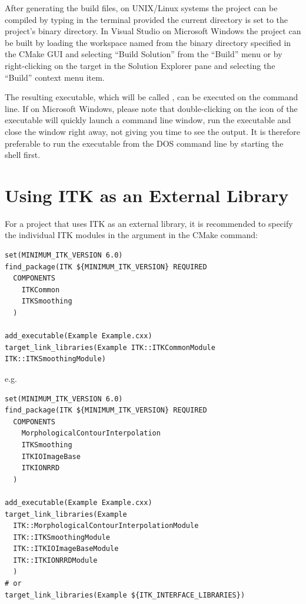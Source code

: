 After generating the build files, on UNIX/Linux systems the project can be
compiled by typing  in the terminal provided the current directory
is set to the project's binary directory. In Visual Studio on Microsoft Windows
the project can be built by loading the workspace named 
from the binary directory specified in the CMake GUI and selecting
``Build Solution'' from the ``Build'' menu or by right-clicking on
the  target in the Solution Explorer pane and selecting
the ``Build'' context menu item.

The resulting executable, which will be called , can be
executed on the command line. If on Microsoft Windows, please note that
double-clicking on the icon of the executable will quickly launch a command line
window, run the executable and close the window right away, not giving you time
to see the output. It is therefore preferable to run the executable from the DOS
command line by starting the  shell first.

\section{Using ITK as an External Library}%
\label{sec:UsingITKAsExternalLibrary}

For a project that uses ITK as an external library, it is recommended to
specify the individual ITK modules in the  argument in the
 CMake command:

\small
\begin{verbatim}
set(MINIMUM_ITK_VERSION 6.0)
find_package(ITK ${MINIMUM_ITK_VERSION} REQUIRED
  COMPONENTS
    ITKCommon
    ITKSmoothing
  )

add_executable(Example Example.cxx)
target_link_libraries(Example ITK::ITKCommonModule ITK::ITKSmoothingModule)
\end{verbatim}
\normalsize

e.g.

\small
\begin{verbatim}
set(MINIMUM_ITK_VERSION 6.0)
find_package(ITK ${MINIMUM_ITK_VERSION} REQUIRED
  COMPONENTS
    MorphologicalContourInterpolation
    ITKSmoothing
    ITKIOImageBase
    ITKIONRRD
  )

add_executable(Example Example.cxx)
target_link_libraries(Example
  ITK::MorphologicalContourInterpolationModule
  ITK::ITKSmoothingModule
  ITK::ITKIOImageBaseModule
  ITK::ITKIONRRDModule
  )
# or
target_link_libraries(Example ${ITK_INTERFACE_LIBRARIES})
\end{verbatim}
\normalsize

